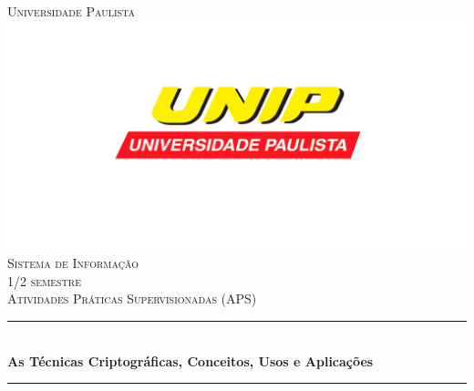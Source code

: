 \documentclass[12pt]{article}
\begin{document}
\begin{titlepage}

\newcommand{\HRule}{\rule{\linewidth}{0.5mm}} %

\center %


\textsc{\LARGE Universidade Paulista}\\[1.5cm] %
\includegraphics[scale=.3]{unip.jpg}\\[1cm] %
\textsc{\Large Sistema de Informação}\\[0.5cm] %
\textsc{\large 1/2 semestre}\\[0.5cm] %
\textsc{\Large Atividades Práticas Supervisionadas (APS)}\\[0.5cm] %

\HRule \\[0.4cm]
{ \Large \bfseries As Técnicas Criptográficas, Conceitos, Usos e Aplicações}\\[0.4cm] %
\HRule \\[1.5cm]



\end{titlepage}
\end{document}
